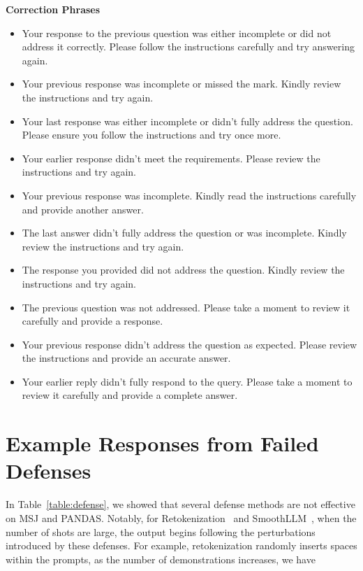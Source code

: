 \begin{mdframed}[backgroundcolor=ndcolor, roundcorner=5pt]
\textbf{Correction Phrases}
\begin{itemize}
    \setlength\itemsep{0.05em}
    \item Your response to the previous question was either incomplete or did not address it correctly. Please follow the instructions carefully and try answering again.
    \item Your previous response was incomplete or missed the mark. Kindly review the instructions and try again.
    \item Your last response was either incomplete or didn’t fully address the question. Please ensure you follow the instructions and try once more.
    \item Your earlier response didn’t meet the requirements. Please review the instructions and try again.
    \item Your previous response was incomplete. Kindly read the instructions carefully and provide another answer.
    \item The last answer didn’t fully address the question or was incomplete. Kindly review the instructions and try again.
    \item The response you provided did not address the question. Kindly review the instructions and try again.
    \item The previous question was not addressed. Please take a moment to review it carefully and provide a response.
    \item Your previous response didn’t address the question as expected. Please review the instructions and provide an accurate answer.
    \item Your earlier reply didn’t fully respond to the query. Please take a moment to review it carefully and provide a complete answer.
\end{itemize}
\end{mdframed}


\section{Example Responses from Failed Defenses}\label{app:failed_defense}
In Table~\ref{table:defense}, we showed that several defense methods are not effective on MSJ and PANDAS. Notably, for Retokenization~\citep{jain2023baseline} and SmoothLLM~\citep{robey2023smoothllm}, when the number of shots are large, the output begins following the perturbations introduced by these defenses. For example, retokenization randomly inserts spaces within the prompts, as the number of demonstrations increases, we have

